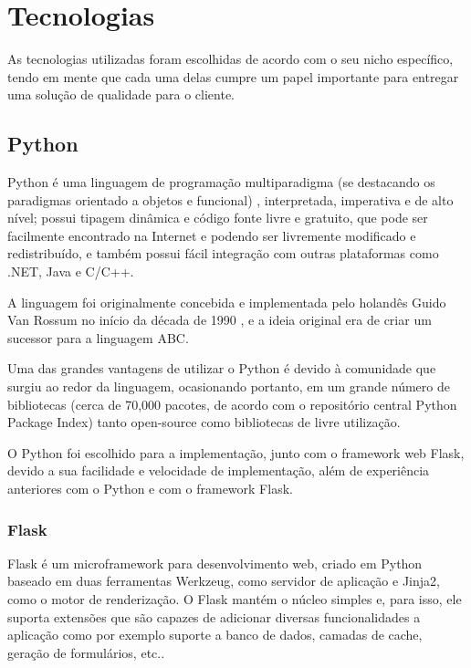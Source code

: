 \documentclass[
	article,			%
	11pt,				%
	oneside,			%
	a4paper,			%
	english,			%
	brazil,				%
	sumario=tradicional
	]{abntex2}
\begin{document}
\section{Tecnologias}

As tecnologias utilizadas foram escolhidas de acordo com o seu nicho específico, tendo em mente que cada uma delas cumpre um papel importante para entregar uma solução de qualidade para o cliente.

\subsection{Python}

Python é uma linguagem de programação multiparadigma (se destacando os paradigmas orientado a objetos e funcional) , interpretada, imperativa e de alto nível; possui tipagem dinâmica e código fonte livre \cite{pythonlicense} e gratuito, que pode ser facilmente encontrado na Internet e podendo ser livremente modificado e redistribuído, e também possui fácil integração com outras plataformas como .NET, Java e C/C++.

A linguagem foi originalmente concebida e implementada pelo holandês Guido Van Rossum no início da década de 1990 \cite{pythonlicense}, e a ideia original era de criar um sucessor para a linguagem ABC.

Uma das grandes vantagens de utilizar o Python é devido à comunidade que surgiu ao redor da linguagem, ocasionando portanto, em um grande número de bibliotecas (cerca de 70,000 pacotes, de acordo com o repositório central Python Package Index)\cite{pypi} tanto open-source como bibliotecas de livre utilização.

O Python foi escolhido para a implementação, junto com o framework web Flask, devido a sua facilidade e velocidade de implementação, além de experiência anteriores com o Python e com o framework Flask.

\subsubsection{Flask}

Flask é um microframework para desenvolvimento web, criado em Python baseado em duas ferramentas Werkzeug, como servidor de aplicação e Jinja2, como o motor de renderização.
O Flask mantém o núcleo simples e, para isso, ele suporta extensões que são capazes de adicionar diversas funcionalidades a aplicação como por exemplo suporte a banco de dados, camadas de cache, geração de formulários, etc.. \cite{flask}
\end{document}
